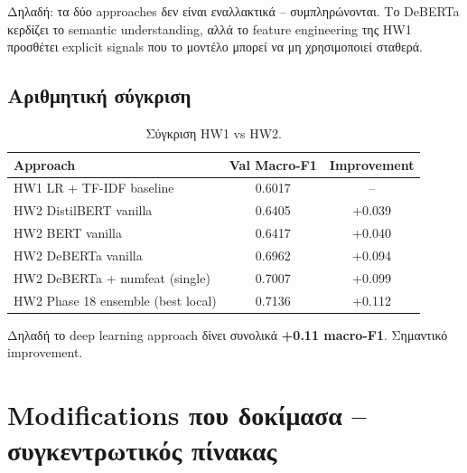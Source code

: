\documentclass[12pt]{fphw}
\begin{document}
Δηλαδή: τα δύο approaches δεν είναι εναλλακτικά -- συμπληρώνονται. Το DeBERTa κερδίζει το semantic understanding, αλλά το feature engineering της HW1 προσθέτει explicit signals που το μοντέλο μπορεί να μη χρησιμοποιεί σταθερά.

\subsection{Αριθμητική σύγκριση}

\begin{table}[H]
\centering
\begin{tabular}{lcc}
\toprule
Approach & Val Macro-F1 & Improvement \\
\midrule
HW1 LR + TF-IDF baseline & 0.6017 & -- \\
HW2 DistilBERT vanilla & 0.6405 & +0.039 \\
HW2 BERT vanilla & 0.6417 & +0.040 \\
HW2 DeBERTa vanilla & 0.6962 & +0.094 \\
HW2 DeBERTa + numfeat (single) & 0.7007 & +0.099 \\
HW2 Phase 18 ensemble (best local) & 0.7136 & +0.112 \\
\bottomrule
\end{tabular}
\caption{Σύγκριση HW1 vs HW2.}
\end{table}

Δηλαδή το deep learning approach δίνει συνολικά \textbf{+0.11 macro-F1}. Σημαντικό improvement.

\section{Modifications που δοκίμασα -- συγκεντρωτικός πίνακας}
\end{document}
